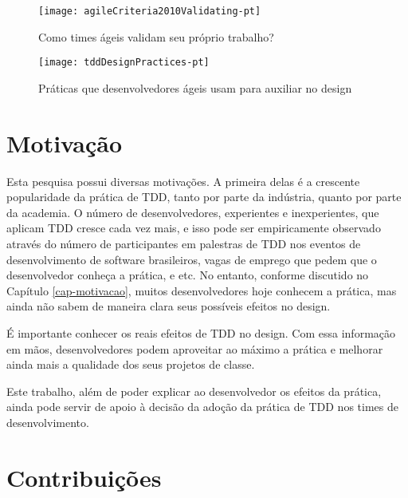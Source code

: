 \begin{figure}[ht]
  \begin{minipage}[b]{0.45\linewidth}
    \centering
    \texttt{[image: agileCriteria2010Validating-pt]}
    \caption{Como times ágeis validam seu próprio trabalho?}
    \label{fig:wambler-agile-2010}
  \end{minipage}
  \hspace{0.5cm}
  \begin{minipage}[b]{0.45\linewidth}
    \centering
    \texttt{[image: tddDesignPractices-pt]}
    \caption{Práticas que desenvolvedores ágeis usam para auxiliar no design}  
    \label{fig:wambler-tdd-2008}
  \end{minipage}
\end{figure}			

\section{Motivação}

Esta pesquisa possui diversas motivações. A primeira delas é a crescente
popularidade da prática de TDD, tanto por parte da indústria, quanto 
por parte da academia. O número de desenvolvedores, experientes e inexperientes,
que aplicam TDD cresce cada vez mais, e isso pode ser empiricamente
observado através do número de participantes em palestras de TDD nos
eventos de desenvolvimento de software brasileiros, vagas de emprego
que pedem que o desenvolvedor conheça a prática, e etc.
No entanto, conforme discutido no Capítulo \ref{cap-motivacao}, muitos 
desenvolvedores hoje conhecem a prática, mas ainda não sabem de maneira
clara seus possíveis efeitos no design.

É importante conhecer os reais efeitos de TDD no design. Com essa
informação em mãos, desenvolvedores podem aproveitar ao máximo
a prática e melhorar ainda mais a qualidade dos seus projetos
de classe. 

Este trabalho, além de poder explicar ao desenvolvedor os efeitos
da prática, ainda pode servir de apoio à decisão da adoção da prática
de TDD nos times de desenvolvimento.

\section{Contribuições}

